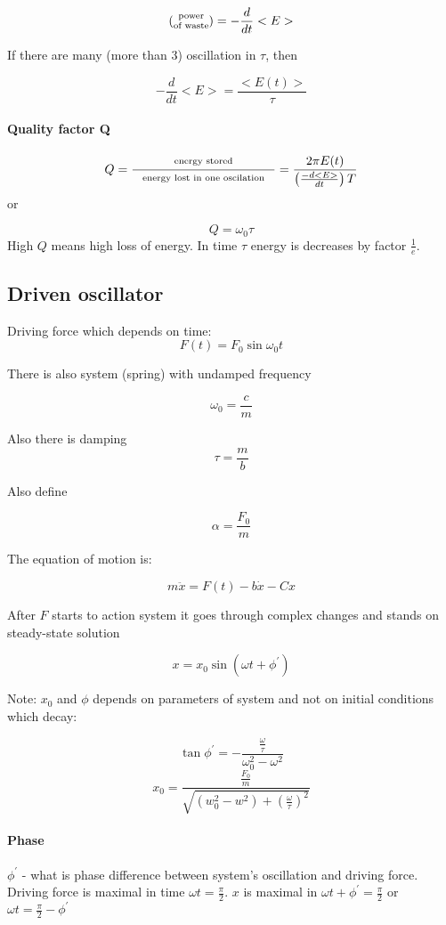 $$\left(\parbox{1cm}{\centering \scriptsize power of waste}\right) = - \frac{d}{dt} <E>$$

If there are many (more than 3) oscillation in $\tau$, then

$$-\frac{d}{dt} <E> = \frac{<E(t)>}{\tau}$$

\paragraph{Quality factor Q}

$$Q = \frac{\parbox{4cm}{\centering \scriptsize energy stored}}{\parbox{4cm}{\centering \scriptsize energy lost in one oscilation}} = \frac{2\pi E(t)}{\left(\frac{-d<E>}{dt}\right)T}$$
 or
 
 $$Q = \omega_0 \tau$$
High $Q$ means high loss of energy. In time $\tau$ energy is decreases by factor $\frac{1}{e}$.

\subsection{Driven oscillator}
Driving force which depends on time:
$$F(t) = F_0 \sin \omega_0 t$$

There is also system (spring) with undamped frequency

$$\omega_0  = \frac{c}{m}$$

Also there is damping 
$$\tau = \frac{m}{b}$$

Also define

$$\alpha = \frac{F_0}{m}$$

The equation of motion is:

$$m \ddot{x} = F(t) - b \dot{x} - Cx$$

After $F$ starts to action system it goes through complex changes and stands on steady-state solution

$$x = x_0 \sin \left( \omega t + \phi^\prime \right)$$

Note: $x_0$ and $\phi$ depends on parameters of system and not on initial conditions which decay:

$$\tan \phi^\prime = - \frac{\frac{\omega}{\tau}}{\omega_0^2 - \omega^2}$$
$$x_0 = \frac{\frac{F_0}{m}}{\sqrt{\left(w_0^2-w^2\right) + \left(\frac{\omega}{\tau}\right)^2}}$$

\paragraph{Phase}
$\phi^\prime$ - what is phase difference between system's oscillation and driving force. Driving force is maximal in time $\omega t = \frac{\pi}{2}$. $x$ is maximal in $\omega t + \phi^\prime = \frac{\pi}{2}$ or $\omega t = \frac{\pi}{2} - \phi^\prime$
